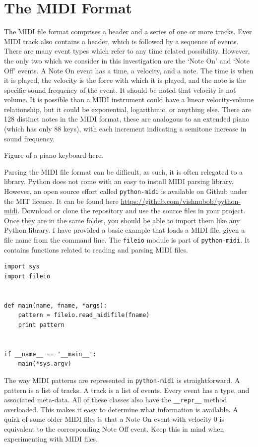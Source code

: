 \documentclass[10pt]{book}
\begin{document}
\section{The MIDI Format}

The MIDI file format comprises a header and a series of one or more tracks. Ever MIDI track also contains a header, which is followed by a sequence of events. There are many event types which refer to any time related possibility. However, the only two which we consider in this investigation are the `Note On' and `Note Off' events. A Note On event has a time, a velocity, and a note. The time is when it is played, the velocity is the force with which it is played, and the note is the specific sound frequency of the event. It should be noted that velocity is not volume. It is possible than a MIDI instrument could have a linear velocity-volume relationship, but it could be exponential, logarithmic, or anything else. There are 128 distinct notes in the MIDI format, these are analogous to an extended piano (which has only 88 keys), with each increment indicating a semitone increase in sound frequency.

Figure of a piano keyboard here.

Parsing the MIDI file format can be difficult, as such, it is often relegated to a library. Python does not come with an easy to install MIDI parsing library. However, an open source effort called \texttt{python-midi} is available on Github under the MIT licence. It can be found here \url{https://github.com/vishnubob/python-midi}. Download or clone the repository and use the source files in your project. Once they are in the same folder, you should be able to import them like any Python library. I have provided a basic example that loads a MIDI file, given a file name from the command line. The \texttt{fileio} module is part of \texttt{python-midi}. It contains functions related to reading and parsing MIDI files.


\begin{verbatim}
import sys
import fileio


def main(name, fname, *args):
    pattern = fileio.read_midifile(fname)
    print pattern


if __name__ == '__main__':
    main(*sys.argv)

\end{verbatim}


The way MIDI patterns are represented in \texttt{python-midi} is straightforward. A pattern is a list of tracks. A track is a list of events. Every event has a type, and associated meta-data. All of these classes also have the \texttt{\_\_repr\_\_} method overloaded. This makes it easy to determine what information is available. A quirk of some older MIDI files is that a Note On event with velocity 0 is equivalent to the corresponding Note Off event. Keep this in mind when experimenting with MIDI files.
\end{document}
